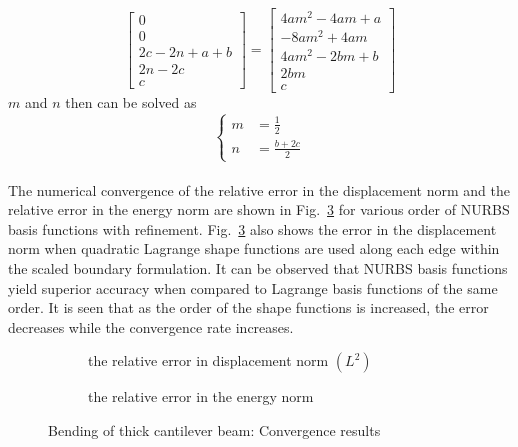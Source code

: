     \begin{equation}
        \begin{bmatrix}
            0 \\
            0 \\
            2c - 2n +a +b \\
            2n - 2c \\
            c
        \end{bmatrix} = 
        \begin{bmatrix}
            4am^2-4am+a \\
            -8am^2 + 4am \\
            4am^2 -2bm +b \\
            2bm \\
            c
        \end{bmatrix}
    \end{equation}
%
$m$ and $n$ then can be solved as
    \begin{equation}
        \left\{
        \begin{aligned}
            m &= \frac{1}{2} \\
            n &= \frac{b+2c}{2}
        \end{aligned}
        \right.
    \end{equation}
%
\paragraph{}
The numerical convergence of the relative error in the displacement norm and the relative error in the energy norm are shown in Fig.~\ref{iso_fig:cantilever_beam_convergence} for various order of NURBS basis functions with refinement.
Fig.~\ref{iso_fig:cantilever_beam_convergence} also shows the error in the displacement norm when quadratic Lagrange shape functions are used along each edge within the scaled boundary formulation.
It can be observed that NURBS basis functions yield superior accuracy when compared to Lagrange basis functions of the same order.
It is seen that as the order of the shape functions is increased, the error decreases while the convergence rate increases.
\begin{figure}
    \begin{subfigure}[b]{1\linewidth}
        \centering
        \scalebox{0.7}{
            
        }
        \label{iso_fig:cantilever_beam_displacement_convergence}
        \caption{the relative error in displacement norm $(L^2)$}
    \end{subfigure}
    
    \begin{subfigure}[b]{1\linewidth}
        \centering
        \scalebox{0.7}{
            
        }
        \label{iso_fig:cantilever_beam_energy_convergence}
        \caption{the relative error in the energy norm}
    \end{subfigure}
\caption{Bending of thick cantilever beam: Convergence results}
\label{iso_fig:cantilever_beam_convergence}
\end{figure}
%
\pagebreak